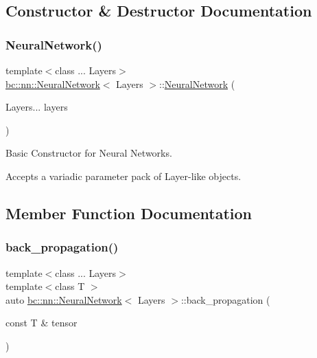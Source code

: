 \subsection{Constructor \& Destructor Documentation}
\mbox{\label{structbc_1_1nn_1_1NeuralNetwork_aecab2b320ed500b2a097210410605a24}} 
\subsubsection{\texorpdfstring{Neural\+Network()}{NeuralNetwork()}}
{\footnotesize\ttfamily template$<$class ... Layers$>$ \\
\hyperlink{structbc_1_1nn_1_1NeuralNetwork}{bc\+::nn\+::\+Neural\+Network}$<$ Layers $>$\+::\hyperlink{structbc_1_1nn_1_1NeuralNetwork}{Neural\+Network} (\begin{DoxyParamCaption}\item[{Layers...}]{layers }\end{DoxyParamCaption})\hspace{0.3cm}{\ttfamily [inline]}}



Basic Constructor for Neural Networks. 

Accepts a variadic parameter pack of Layer-\/like objects. 

\subsection{Member Function Documentation}
\mbox{\label{structbc_1_1nn_1_1NeuralNetwork_ab1cda131c79efc9b13d87a0f323c1752}} 
\subsubsection{\texorpdfstring{back\+\_\+propagation()}{back\_propagation()}}
{\footnotesize\ttfamily template$<$class ... Layers$>$ \\
template$<$class T $>$ \\
auto \hyperlink{structbc_1_1nn_1_1NeuralNetwork}{bc\+::nn\+::\+Neural\+Network}$<$ Layers $>$\+::back\+\_\+propagation (\begin{DoxyParamCaption}\item[{const T \&}]{tensor }\end{DoxyParamCaption})\hspace{0.3cm}{\ttfamily [inline]}}



